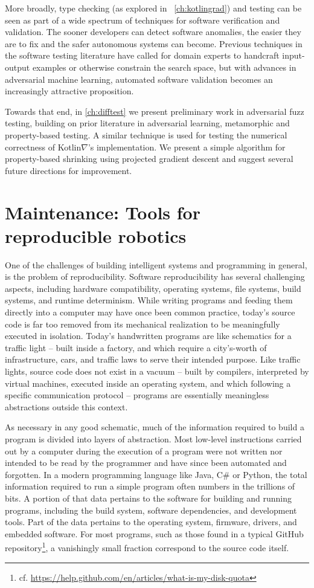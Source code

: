 \documentclass[12pt,initial,twoside,maitrise]{dms}
\numberwithin{equation}{section}
\numberwithin{table}{chapter}
\numberwithin{figure}{chapter}
\begin{document}
More broadly, type checking (as explored in ~\autoref{ch:kotlingrad}) and testing can be seen as part of a wide spectrum of techniques for software verification and validation. The sooner developers can detect software anomalies, the easier they are to fix and the safer autonomous systems can become. Previous techniques in the software testing literature have called for domain experts to handcraft input-output examples or otherwise constrain the search space, but with advances in adversarial machine learning, automated software validation becomes an increasingly attractive proposition.

Towards that end, in \autoref{ch:difftest} we present preliminary work in adversarial fuzz testing, building on prior literature in adversarial learning, metamorphic and property-based testing. A similar technique is used for testing the numerical correctness of Kotlin$\nabla$'s implementation. We present a simple algorithm for property-based shrinking using projected gradient descent and suggest several future directions for improvement.

\section{Maintenance: Tools for reproducible robotics}

One of the challenges of building intelligent systems and programming in general, is the problem of reproducibility. Software reproducibility has several challenging aspects, including hardware compatibility, operating systems, file systems, build systems, and runtime determinism. While writing programs and feeding them directly into a computer may have once been common practice, today's source code is far too removed from its mechanical realization to be meaningfully executed in isolation. Today's handwritten programs are like schematics for a traffic light -- built inside a factory, and which require a city's-worth of infrastructure, cars, and traffic laws to serve their intended purpose. Like traffic lights, source code does not exist in a vacuum -- built by compilers, interpreted by virtual machines, executed inside an operating system, and which following a specific communication protocol -- programs are essentially meaningless abstractions outside this context.

As necessary in any good schematic, much of the information required to build a program is divided into layers of abstraction. Most low-level instructions carried out by a computer during the execution of a program were not written nor intended to be read by the programmer and have since been automated and forgotten. In a modern programming language like Java, C\# or Python, the total information required to run a simple program often numbers in the trillions of bits. A portion of that data pertains to the software for building and running programs, including the build system, software dependencies, and development tools. Part of the data pertains to the operating system, firmware, drivers, and embedded software. For most programs, such as those found in a typical GitHub repository\footnote{cf. \url{https://help.github.com/en/articles/what-is-my-disk-quota}}, a vanishingly small fraction correspond to the source code itself.
\end{document}

